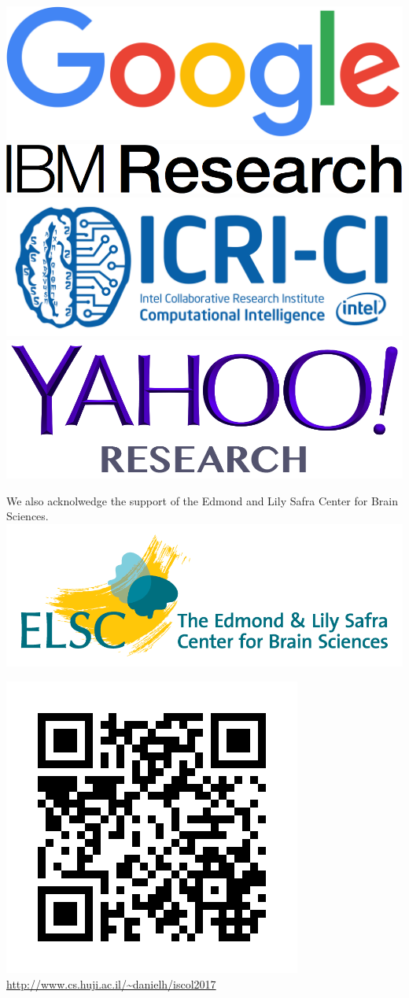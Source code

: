 \documentclass[a0,portrait]{a0poster}
\begin{document}
    \includegraphics{google_logo.png}\\
    \includegraphics{ibmresearch_logo.png}\\
    \includegraphics{icrici_logo.png}\\
    \includegraphics{yahoo_logo.png}

    We also acknolwedge the support of the Edmond and Lily Safra Center for
    Brain Sciences. \includegraphics{elsc_logo.png}


    \includegraphics{qr_code.jpg}
    \url{http://www.cs.huji.ac.il/~danielh/iscol2017}
\end{document}
